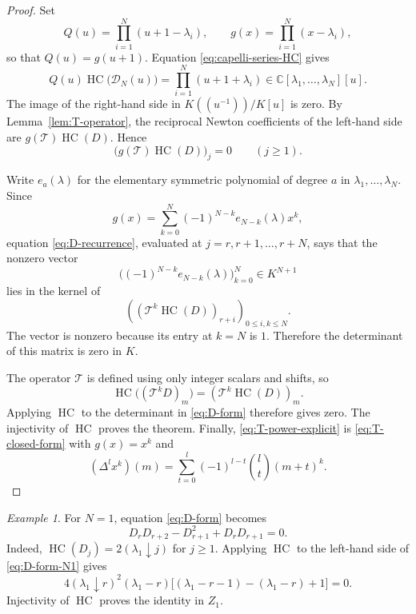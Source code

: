 \documentclass[11pt]{amsart}
\numberwithin{equation}{section}
\theoremstyle{definition}
\theoremstyle{remark}
\newtheorem{example}[theorem]{Example}
\newcommand{\C}{\mathbb C}
\newcommand{\HC}{\operatorname{HC}}
\newcommand{\fall}[2]{(#1\mathbin{\downarrow}#2)}
\newcommand{\calD}{\mathcal D}
\begin{document}
\begin{proof}
Set
\[
 Q(u)=\prod_{i=1}^N(u+1-\lambda_i),
 \qquad
 g(x)=\prod_{i=1}^N(x-\lambda_i),
\]
so that \(Q(u)=g(u+1)\).  Equation
\eqref{eq:capelli-series-HC} gives
\begin{equation}
 Q(u)\HC\bigl(\calD_N(u)\bigr)
 =\prod_{i=1}^N(u+1+\lambda_i)\in\C[\lambda_1,\ldots,
 \lambda_N][u].
 \label{eq:polynomial-after-clearing}
\end{equation}
The image of the right-hand side in
\(K((u^{-1}))/K[u]\) is zero.  By
Lemma~\ref{lem:T-operator}, the reciprocal Newton coefficients of the
left-hand side are
\(g(\mathcal T)\HC(D)\).  Hence
\begin{equation}
 \bigl(g(\mathcal T)\HC(D)\bigr)_j=0
 \qquad(j\geq1).
 \label{eq:D-recurrence}
\end{equation}

Write \(e_a(\lambda)\) for the elementary symmetric polynomial of
degree \(a\) in \(\lambda_1,\ldots,\lambda_N\).  Since
\[
 g(x)=\sum_{k=0}^N(-1)^{N-k}e_{N-k}(\lambda)x^k,
\]
equation \eqref{eq:D-recurrence}, evaluated at
\(j=r,r+1,\ldots,r+N\), says that the nonzero vector
\[
 \bigl((-1)^{N-k}e_{N-k}(\lambda)\bigr)_{k=0}^{N}
 \in K^{N+1}
\]
lies in the kernel of
\[
 \left(
  (\mathcal T^k\HC(D))_{r+i}
 \right)_{0\leq i,k\leq N}.
\]
The vector is nonzero because its entry at \(k=N\) is \(1\).
Therefore the determinant of this matrix is zero in \(K\).

The operator \(\mathcal T\) is defined using only integer scalars and
shifts, so
\[
 \HC\bigl((\mathcal T^kD)_m\bigr)
 =(\mathcal T^k\HC(D))_m.
\]
Applying \(\HC\) to the determinant in \eqref{eq:D-form} therefore
gives zero.  The injectivity of \(\HC\) proves the theorem.  Finally,
\eqref{eq:T-power-explicit} is \eqref{eq:T-closed-form} with
\(g(x)=x^k\) and
\[
 (\Delta^lx^k)(m)
 =\sum_{t=0}^{l}(-1)^{l-t}\binom{l}{t}(m+t)^k.
\]
\end{proof}

\begin{example}
\label{ex:D-form-N1}
For \(N=1\), equation \eqref{eq:D-form} becomes
\begin{equation}
 D_rD_{r+2}-D_{r+1}^2+D_rD_{r+1}=0.
 \label{eq:D-form-N1}
\end{equation}
Indeed, \(\HC(D_j)=2\fall{\lambda_1}{j}\) for \(j\geq1\).  Applying
\(\HC\) to the left-hand side of \eqref{eq:D-form-N1} gives
\[
 4\fall{\lambda_1}{r}^{2}(\lambda_1-r)
 \bigl[(\lambda_1-r-1)-(\lambda_1-r)+1\bigr]=0.
\]
Injectivity of \(\HC\) proves the identity in \(Z_1\).
\end{example}
\end{document}
